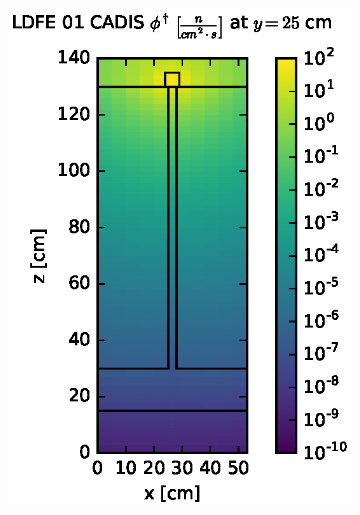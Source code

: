 \begin{figure}[!htb]
\begin{subfigure}{0.4\textwidth}
\includegraphics[max height=0.445\textheight]
{img/steel-plots/cad-adj/flux-ldfe01-slice.eps}
\end{subfigure} ~
\begin{subfigure}{0.4\textwidth}

\end{subfigure}
\end{figure}
